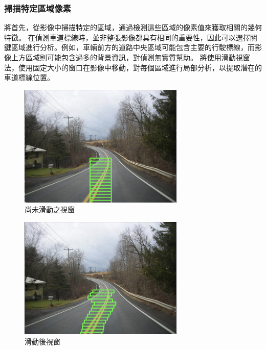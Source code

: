 \documentclass[12pt]{article}       %
\begin{document}
\subsubsection{掃描特定區域像素}
\hspace{2em}將首先，從影像中掃描特定的區域，通過檢測這些區域的像素值來獲取相關的幾何特徵。
在偵測車道標線時，並非整張影像都具有相同的重要性，因此可以選擇關鍵區域進行分析。例如，車輛前方的道路中央區域可能包含主要的行駛標線，而影像上方區域則可能包含過多的背景資訊，對偵測無實質幫助。
將使用滑動視窗法，使用固定大小的窗口在影像中移動，對每個區域進行局部分析，以提取潛在的車道標線位置。
\begin{figure}[H]
    \centering
    \includegraphics[width=0.7\textwidth]{6.png}     %
    \caption{尚未滑動之視窗}    %
    \label{fig:6}    %
\end{figure}
\begin{figure}[H]
    \centering
    \includegraphics[width=0.7\textwidth]{7.png}     %
    \caption{滑動後視窗}    %
    \label{fig:7}    %
\end{figure}
\end{document}
